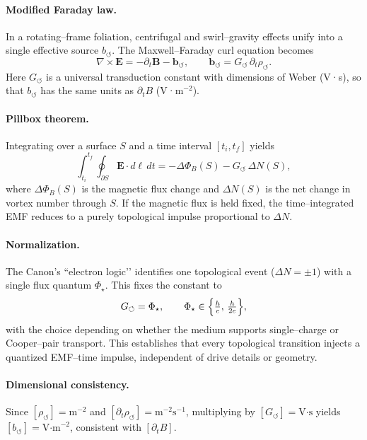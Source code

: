 \documentclass[11pt]{article}
\begin{document}
        \paragraph*{Modified Faraday law.}
        In a rotating–frame foliation, centrifugal and swirl–gravity effects unify into a single effective
        source $b_{\circlearrowleft}$. The Maxwell–Faraday curl equation becomes
        \[
        \nabla \times \mathbf{E} = -\partial_t \mathbf{B} - \mathbf{b}_{\circlearrowleft},
        \qquad
        \mathbf{b}_{\circlearrowleft} = G_{\circlearrowleft} \, \partial_t \rho_{\circlearrowleft}.
        \]
        Here $G_{\circlearrowleft}$ is a universal transduction constant with dimensions of Weber (V·s), so that
        $b_{\circlearrowleft}$ has the same units as $\partial_t B$ (V·m$^{-2}$).

        \paragraph*{Pillbox theorem.}
        Integrating over a surface $S$ and a time interval $[t_i,t_f]$ yields
        \[
        \int_{t_i}^{t_f} \!\! \oint_{\partial S} \mathbf{E}\cdot d\ell \, dt
        = - \Delta \Phi_B(S) - G_{\circlearrowleft}\, \Delta N(S),
        \]
        where $\Delta \Phi_B(S)$ is the magnetic flux change and $\Delta N(S)$ is the net change in vortex
        number through $S$. If the magnetic flux is held fixed, the time–integrated EMF reduces to a purely
        topological impulse proportional to $\Delta N$.

        \paragraph*{Normalization.}
        The Canon’s “electron logic’’ identifies one topological event ($\Delta N = \pm 1$) with a single flux
        quantum $\Phi_\star$. This fixes the constant to
        \[
        G_{\circlearrowleft} = \Phi_\star,
        \qquad
        \Phi_\star \in \Bigl\{ \tfrac{h}{e},\,\tfrac{h}{2e} \Bigr\},
        \]
        with the choice depending on whether the medium supports single–charge or Cooper–pair transport.
        This establishes that every topological transition injects a quantized EMF–time impulse, independent
        of drive details or geometry.

        \paragraph*{Dimensional consistency.}
        Since $[\rho_{\circlearrowleft}] = \text{m}^{-2}$ and $[\partial_t \rho_{\circlearrowleft}] =
        \text{m}^{-2}\text{s}^{-1}$, multiplying by $[G_{\circlearrowleft}] = \text{V·s}$ yields
        $[b_{\circlearrowleft}] = \text{V·m}^{-2}$, consistent with $[\partial_t B]$.
\end{document}

